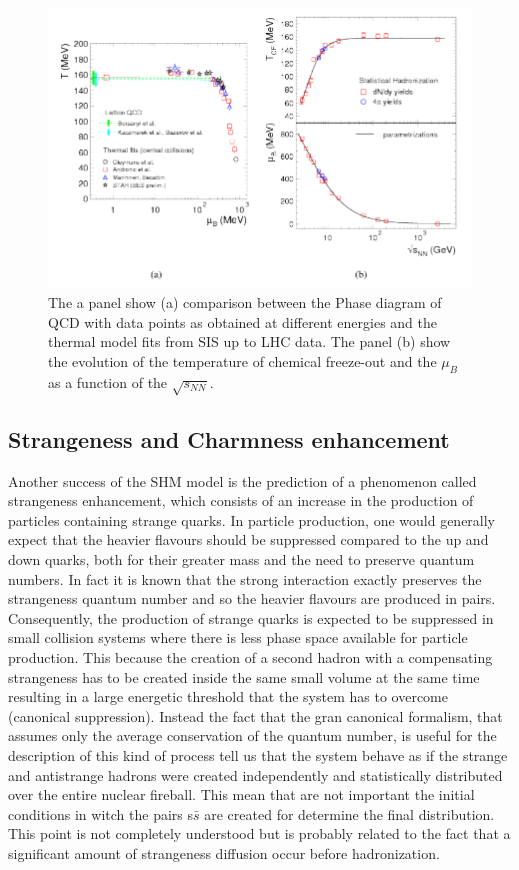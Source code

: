 \documentclass[12pt,a4paper]{book}
\begin{document}
	\begin{figure}
		\includegraphics[width=0.96 \linewidth]{pictures/shm_qcd_comparison.png}
		\caption{ The a panel show (a) comparison between the Phase diagram of QCD with data points as obtained at different energies and the thermal model fits from SIS up to LHC data. The panel (b) show the evolution of the temperature of chemical freeze-out and the $\mu_B$ as a function of the $\sqrt{s_{NN}}$.\cite{Andronic_2017}}
		\label{fig:shm_qcd_comparison}
		
	\end{figure}
	
	\subsection{Strangeness and Charmness enhancement}
	Another success of the SHM model is the prediction of a phenomenon called strangeness enhancement, which consists of an increase in the production of particles containing strange quarks.
	In particle production, one would generally expect that the heavier flavours should be suppressed compared to the up and down quarks, both for their greater mass and the need to preserve quantum numbers. In fact it is known that the strong interaction exactly preserves the strangeness quantum number and so the heavier flavours are produced in pairs. Consequently, the production of strange quarks is expected to be suppressed in small collision systems where there is less phase space available for particle production. This because the creation of a second hadron with a compensating strangeness has to be created inside the same small volume at the same time resulting in a large energetic threshold that the system has to overcome (canonical suppression). Instead the fact that the gran canonical formalism, that assumes only the average conservation of the quantum number, is useful for the description of this kind of process tell us that the system behave as if the strange and antistrange hadrons were created independently and statistically distributed over the entire nuclear fireball. This mean that are not important the initial conditions in witch the pairs s$\bar{s}$ are created for determine the final distribution. This point is not completely understood but is probably related to the fact that a significant amount of strangeness diffusion occur before hadronization.
	
\end{document}
